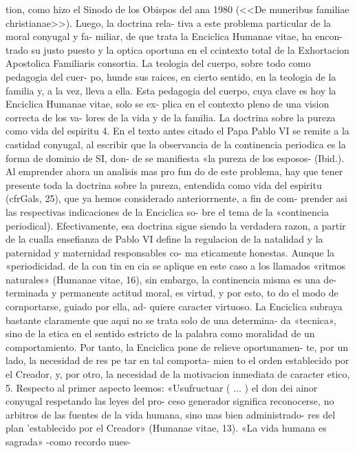 \documentclass[letterpaper]{report}
\begin{document}
tion, como hizo el Sinodo de los Obispos del ana 1980 (<<De 
muneribus familiae christianae>>). Luego, la doctrina rela- 
tiva a este problema particular de la moral conyugal y fa- 
miliar, de que trata la Enciclica Humanae vitae, ha encon- 
trado su justo puesto y la optica oportuna en el ccintexto 
total de la Exhortacion Apostolica Familiaris consortia. La 
teologia del cuerpo, sobre todo como pedagogia del cuer- 
po, hunde sus raices, en cierto sentido, en la teologia de la 
familia y, a la vez, lleva a ella. Esta pedagogia del cuerpo, 
cuya clave es hoy la Enciclica Humanae vitae, solo se ex- 
plica en el contexto pleno de una vision correcta de los va- 
	lores de la vida y de la familia.
La doctrina sobre la pureza como vida del espiritu 
4. En el texto antes citado el Papa Pablo VI se remite 
a la castidad conyugal, al escribir que la observancia de 
la continencia periodica es la forma de dominio de SI, don- 
de se manifiesta «la pureza de los esposos- (Ibid.). 
Al emprender ahora un analisis mas pro fun do de este 
problema, hay que tener presente toda la doctrina sobre 
la pureza, entendida como vida del espiritu (cfrGals, 25), 
que ya hemos considerado anteriorrnente, a fin de com- 
prender asi las respectivas indicaciones de la Enciclica so- 
bre el tema de la «continencia periodical). Efectivamente, 
esa doctrina sigue siendo la verdadera razon, a partir de 
la cualla ensefianza de Pablo VI define la regulacion de 
la natalidad y la paternidad y maternidad responsables co- 
ma eticamente honestas. 
Aunque la «periodicidad. de la con tin en cia se aplique 
en este caso a los llamados «ritmos naturales» (Humanae 
vitae, 16), sin embargo, la continencia misma es una de- 
terminada y permanente actitud moral, es virtud, y por 
esto, to do el modo de cornportarse, guiado por ella, ad- 
quiere caracter virtuoso. La Enciclica subraya bastante 
claramente que aqui no se trata solo de una determina- 
da «tecnica», sino de la etica en el sentido estricto de la 
palabra como moralidad de un comportamiento. 
Por tanto, la Enciclica pone de relieve oportunamen- 
te, por un lado, la necesidad de res pe tar en tal comporta- 
mien to el orden establecido por el Creador, y, por otro, la 
necesidad de la motivacion inmediata de caracter etico, 
5. Respecto al primer aspecto leemos: «Usufructuar 
( ... ) el don dei ainor conyugal respetando las leyes del pro- 
ceso generador significa reconocerse, no arbitros de las 
fuentes de la vida humana, sino mas bien administrado- 
res del plan 'establecido por el Creador» (Humanae vitae, 
13). «La vida humana es sagrada» -como recordo nues- 
\end{document}
